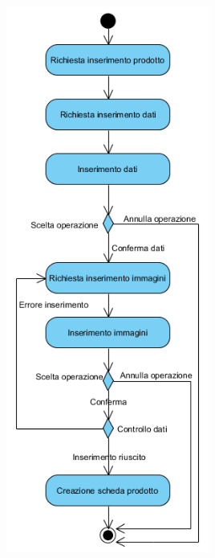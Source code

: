 \begin{center}
	\includegraphics[width=0.5\textwidth]{assets/visualParadigm/attivita/schedaprodotto}
\end{center}

